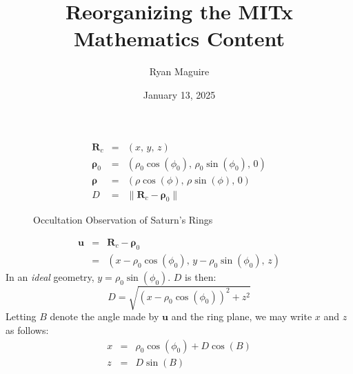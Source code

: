 \documentclass{beamer}
\title{Reorganizing the MITx Mathematics Content}
\author{Ryan Maguire}
\date{January 13, 2025}
\begin{document}
    \maketitle
    \begin{frame}
        \begin{equation}
            \begin{array}{rcl}
                \mathbf{R}_{c}
                &=&(x,\,y,\,z)\\[1em]
                \boldsymbol{\rho}_{0}
                &=&
                \left(
                    \rho_{0}\cos(\phi_{0}),\,\rho_{0}\sin(\phi_{0}),\,0
                \right)\\[1em]
                \boldsymbol{\rho}
                &=&
                \left(
                    \rho\cos(\phi),\,\rho\sin(\phi),\,0
                \right)\\[1em]
                D
                &=&
                \|\mathbf{R}_{c}-\boldsymbol{\rho}_{0}\|
            \end{array}
        \end{equation}
    \end{frame}
    \begin{frame}
        \begin{figure}
            \centering
            \caption{Occultation Observation of Saturn's Rings}
        \end{figure}
    \end{frame}
    \begin{frame}
        \begin{equation}
            \begin{array}{rcl}
                \mathbf{u}
                &=&
                \mathbf{R}_{c}-\boldsymbol{\rho}_{0}\\[1em]
                &=&
                \left(
                    x-\rho_{0}\cos(\phi_{0}),\,
                    y-\rho_{0}\sin(\phi_{0}),\,
                    z
                \right)
            \end{array}
        \end{equation}
        In an \textit{ideal} geometry, $y=\rho_{0}\sin(\phi_{0})$.
        $D$ is then:
        \begin{equation}
            D=\sqrt{\left(x-\rho_{0}\cos(\phi_{0})\right)^{2}+z^{2}}
        \end{equation}
        Letting $B$ denote the angle made by $\mathbf{u}$ and the ring plane,
        we may write $x$ and $z$ as follows:
        \begin{equation}
            \begin{array}{rcl}
                \displaystyle
                x
                &=&
                \displaystyle
                \rho_{0}\cos(\phi_{0})+D\cos(B)\\[1em]
                \displaystyle
                z
                &=&
                \displaystyle
                D\sin(B)
            \end{array}
        \end{equation}
    \end{frame}
\end{document}
